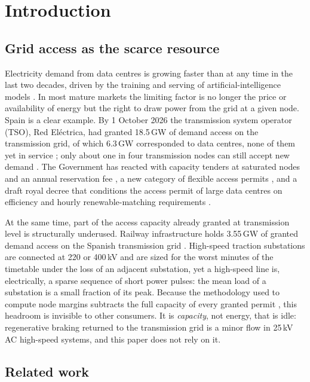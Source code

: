 \section{Introduction}
\label{sec:intro}

\subsection{Grid access as the scarce resource}

Electricity demand from data centres is growing faster than at any time in the last two decades, driven by the training and serving of artificial-intelligence models \cite{iea2025,masanet2020}. In most mature markets the limiting factor is no longer the price or availability of energy but the right to draw power from the grid at a given node. Spain is a clear example. By 1 October 2026 the transmission system operator (TSO), Red El\'ectrica, had granted 18.5\,GW of demand access on the transmission grid, of which 6.3\,GW corresponded to data centres, none of them yet in service \cite{ree2026mapa}; only about one in four transmission nodes can still accept new demand \cite{ree2026nudos}. The Government has reacted with capacity tenders at saturated nodes and an annual reservation fee \cite{rdl72026}, a new category of flexible access permits \cite{cnmc2026flex}, and a draft royal decree that conditions the access permit of large data centres on efficiency and hourly renewable-matching requirements \cite{prd2026,ashurst2026}.

At the same time, part of the access capacity already granted at transmission level is structurally underused. Railway infrastructure holds 3.55\,GW of granted demand access on the Spanish transmission grid \cite{ree2026mapa}. High-speed traction substations are connected at 220 or 400\,kV and are sized for the worst minutes of the timetable under the loss of an adjacent substation, yet a high-speed line is, electrically, a sparse sequence of short power pulses: the mean load of a substation is a small fraction of its peak. Because the methodology used to compute node margins subtracts the full capacity of every granted permit \cite{cnmc2025capacidad}, this headroom is invisible to other consumers. It is \emph{capacity}, not energy, that is idle: regenerative braking returned to the transmission grid is a minor flow in 25\,kV AC high-speed systems, and this paper does not rely on it.

\subsection{Related work}

